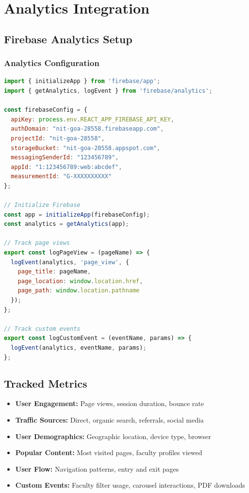 \documentclass[12pt,a4paper]{report}
\begin{document}
\section{Analytics Integration}

\subsection{Firebase Analytics Setup}

\subsubsection*{Analytics Configuration}
\begin{lstlisting}[language=JavaScript, caption=Firebase Analytics Integration]
import { initializeApp } from 'firebase/app';
import { getAnalytics, logEvent } from 'firebase/analytics';

const firebaseConfig = {
  apiKey: process.env.REACT_APP_FIREBASE_API_KEY,
  authDomain: "nit-goa-28558.firebaseapp.com",
  projectId: "nit-goa-28558",
  storageBucket: "nit-goa-28558.appspot.com",
  messagingSenderId: "123456789",
  appId: "1:123456789:web:abcdef",
  measurementId: "G-XXXXXXXXXX"
};

// Initialize Firebase
const app = initializeApp(firebaseConfig);
const analytics = getAnalytics(app);

// Track page views
export const logPageView = (pageName) => {
  logEvent(analytics, 'page_view', {
    page_title: pageName,
    page_location: window.location.href,
    page_path: window.location.pathname
  });
};

// Track custom events
export const logCustomEvent = (eventName, params) => {
  logEvent(analytics, eventName, params);
};
\end{lstlisting}

\subsection{Tracked Metrics}

\begin{itemize}
    \item \textbf{User Engagement:} Page views, session duration, bounce rate
    \item \textbf{Traffic Sources:} Direct, organic search, referrals, social media
    \item \textbf{User Demographics:} Geographic location, device type, browser
    \item \textbf{Popular Content:} Most visited pages, faculty profiles viewed
    \item \textbf{User Flow:} Navigation patterns, entry and exit pages
    \item \textbf{Custom Events:} Faculty filter usage, carousel interactions, PDF downloads
\end{itemize}
\end{document}
